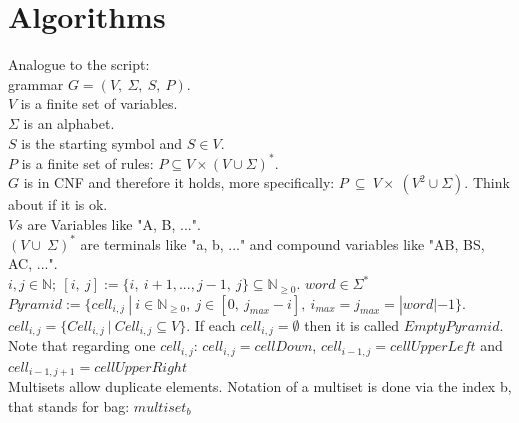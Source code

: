 
\section{Algorithms}\label{algorithms}
\noindent Analogue to the script: \\
grammar $G=(V,\ \Sigma,\ S,\ P)$.\\
$V$ is a finite set of variables. \\
$\Sigma$ is an alphabet. \\
$S$ is the starting symbol and $S \in V$. \\
$P$ is a finite set of rules: $P \subseteq V \times (V \cup \Sigma)^{*}$.\\ 
$G$ is in CNF and therefore it holds, more specifically:  $P\ \subseteq\ V \times\ (V^{2} \cup \Sigma)$. Think about if it is ok. \\
$Vs$ are Variables like "A, B, ...".\\
$(V \cup\ \Sigma)^{*}$ are terminals like "a, b, ..." and compound variables like "AB, BS, AC, ...". \\
$i,j \in \mathbb{N};\ [i,\ j] := \{i,\ i+1,..., j-1,\ j\} \subseteq \mathbb{N}_{\geq 0}$. $word \in \Sigma^* $ \\
$Pyramid :=\{ cell_{i,j}\ |\ i \in \mathbb{N}_{\geq 0},\  j \in [0,\ j_{max}-i],\ i_{max} = j_{max} = |word|-1\}$.\\
$cell_{i,j} = \{Cell_{i,j}\ |\ Cell_{i,j} \subseteq V\}$. If each $cell_{i,j}=\emptyset$ then it is called $EmptyPyramid$.\\
Note that regarding one $cell_{i,j}$: $cell_{i,j} = cellDown$, $cell_{i-1,j} = cellUpperLeft$ and $cell_{i-1,j+1} = cellUpperRight$  \\
Multisets allow duplicate elements. Notation of a multiset is done via the index b, that stands for bag: $multiset_b$\\


